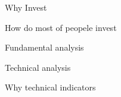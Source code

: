 \documentclass[../main.tex]{subfiles}
\begin{document}

Why Invest

How do most of peopele invest

Fundamental analysis

Technical analysis

Why technical indicators
\end{document}

